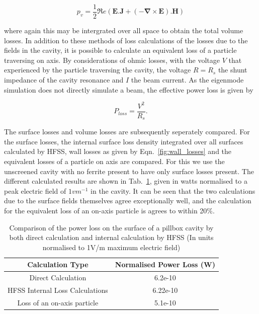 \begin{equation}
p_{v}=\frac{1}{2}\Re{}e\left( \mathbf{E}.\mathbf{J} + \left( -\mathbf{\nabla} \times \mathbf{E} \right).\mathbf{H} \right) 
\label{eqn:vol_loss_density}
\end{equation}

where again this may be intergrated over all space to obtain the total volume losses. In addition to these methods of loss calculations of the losses due to the fields in the cavity, it is possible to calculate an equivalent loss of a particle traversing on axis. By considerations of ohmic losses, with the voltage $V$ that experienced by the particle traversing the cavity, the voltage $R = R_{s}$ the shunt impedance of the cavity resonance and $I$ the beam current. As the eigenmode simulation does not directly simulate a beam, the effective power loss is given by 

\begin{equation}
P_{loss} = \frac{V^{2}}{R_{s}}.
\end{equation}

The surface losses and volume losses are subsequently seperately compared. For the surface losses, the internal surface loss density integrated over all surfaces calculated by HFSS, wall losses as given by Eqn.~\ref{fig:wall_losses} and the equivalent losses of a particle on axis are compared. For this we use the unscreened cavity with no ferrite present to have only surface losses present. The different calculated results are shown in Tab.~\ref{tab:surface_losses_ferr}, given in watts normalised to a peak electric field of $1v m^{-1}$ in the cavity. It can be seen that the two calculations due to the surface fields themselves agree exceptionally well, and the calculation for the equivalent loss of an on-axis particle is agrees to within 20\%. 

\begin{table}
\caption{Comparison of the power loss on the surface of a pillbox cavity by both direct calculation and internal calculation by HFSS (In units normalised to 1V/m maximum electric field)}
\begin{center}
\begin{tabular}{c | c }
Calculation Type & Normalised Power Loss (W)\\ \hline
Direct Calculation & 6.2e-10\\ \hline
HFSS Internal Loss Calculations & 6.22e-10 \\ \hline
Loss of an on-axis particle	 & 5.1e-10 \\
\end{tabular}
\end{center}
\label{tab:surface_losses_ferr}
\end{table}

